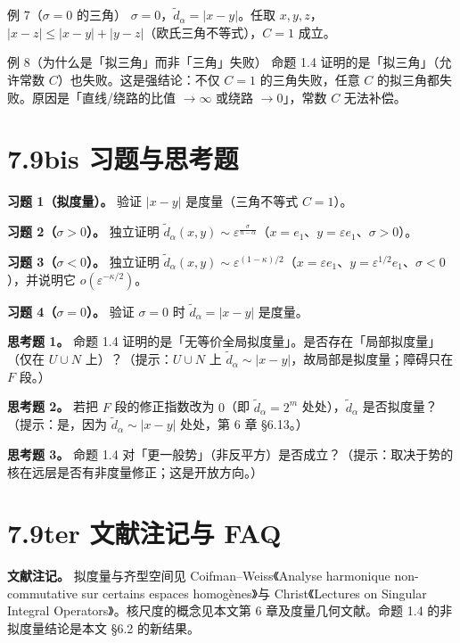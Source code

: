 \documentclass[a4paper,11pt,openany]{ctexbook}
\numberwithin{equation}{chapter}
\numberwithin{figure}{chapter}
\numberwithin{table}{chapter}
\begin{document}
\begin{examplebox}{例 7（$\sigma=0$ 的三角）}
$\sigma=0$，$\widetilde d_\alpha=|x-y|$。任取 $x,y,z$，$|x-z|\le|x-y|+|y-z|$（欧氏三角不等式），$C=1$ 成立。
\end{examplebox}

\begin{examplebox}{例 8（为什么是「拟三角」而非「三角」失败）}
命题 1.4 证明的是「拟三角」（允许常数 $C$）也失败。这是强结论：不仅 $C=1$ 的三角失败，任意 $C$ 的拟三角都失败。原因是「直线/绕路的比值 $\to\infty$ 或绕路 $\to0$」，常数 $C$ 无法补偿。
\end{examplebox}

\section{7.9bis 习题与思考题}

\textbf{习题 1（拟度量）。} 验证 $|x-y|$ 是度量（三角不等式 $C=1$）。

\textbf{习题 2（$\sigma>0$）。} 独立证明 $\widetilde d_\alpha(x,y)\sim\varepsilon^{\frac{\sigma}{n-\alpha}}$（$x=e_1$、$y=\varepsilon e_1$、$\sigma>0$）。

\textbf{习题 3（$\sigma<0$）。} 独立证明 $\widetilde d_\alpha(x,y)\sim\varepsilon^{(1-\kappa)/2}$（$x=\varepsilon e_1$、$y=\varepsilon^{1/2}e_1$、$\sigma<0$），并说明它 $o(\varepsilon^{-\kappa/2})$。

\textbf{习题 4（$\sigma=0$）。} 验证 $\sigma=0$ 时 $\widetilde d_\alpha=|x-y|$ 是度量。

\textbf{思考题 1。} 命题 1.4 证明的是「无等价全局拟度量」。是否存在「局部拟度量」（仅在 $U\cup N$ 上）？（提示：$U\cup N$ 上 $\widetilde d_\alpha\sim|x-y|$，故局部是拟度量；障碍只在 $F$ 段。）

\textbf{思考题 2。} 若把 $F$ 段的修正指数改为 $0$（即 $\widetilde d_\alpha=2^m$ 处处），$\widetilde d_\alpha$ 是否拟度量？（提示：是，因为 $\widetilde d_\alpha\sim|x-y|$ 处处，第 6 章 §6.13。）

\textbf{思考题 3。} 命题 1.4 对「更一般势」（非反平方）是否成立？（提示：取决于势的核在远层是否有非度量修正；这是开放方向。）

\section{7.9ter 文献注记与 FAQ}

\textbf{文献注记。} 拟度量与齐型空间见 Coifman–Weiss《Analyse harmonique non-commutative sur certains espaces homogènes》与 Christ《Lectures on Singular Integral Operators》。核尺度的概念见本文第 6 章及度量几何文献。命题 1.4 的非拟度量结论是本文 §6.2 的新结果。
\end{document}
